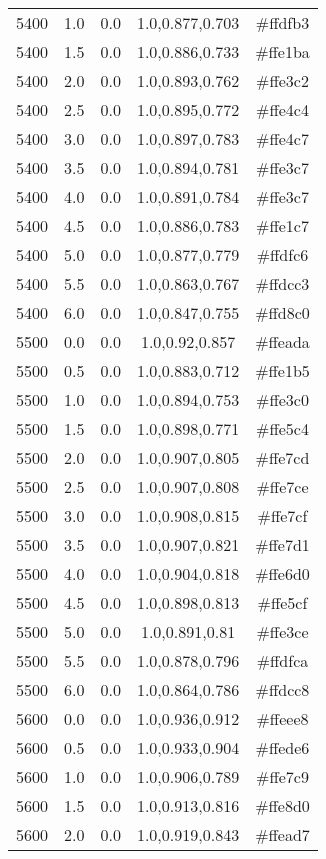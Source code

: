 \begin{tabular}{ccccc}
5400 & 1.0 & 0.0 & 1.0,0.877,0.703 & \#ffdfb3 \\ 
5400 & 1.5 & 0.0 & 1.0,0.886,0.733 & \#ffe1ba \\ 
5400 & 2.0 & 0.0 & 1.0,0.893,0.762 & \#ffe3c2 \\ 
5400 & 2.5 & 0.0 & 1.0,0.895,0.772 & \#ffe4c4 \\ 
5400 & 3.0 & 0.0 & 1.0,0.897,0.783 & \#ffe4c7 \\ 
5400 & 3.5 & 0.0 & 1.0,0.894,0.781 & \#ffe3c7 \\ 
5400 & 4.0 & 0.0 & 1.0,0.891,0.784 & \#ffe3c7 \\ 
5400 & 4.5 & 0.0 & 1.0,0.886,0.783 & \#ffe1c7 \\ 
5400 & 5.0 & 0.0 & 1.0,0.877,0.779 & \#ffdfc6 \\ 
5400 & 5.5 & 0.0 & 1.0,0.863,0.767 & \#ffdcc3 \\ 
5400 & 6.0 & 0.0 & 1.0,0.847,0.755 & \#ffd8c0 \\ 
5500 & 0.0 & 0.0 & 1.0,0.92,0.857 & \#ffeada \\ 
5500 & 0.5 & 0.0 & 1.0,0.883,0.712 & \#ffe1b5 \\ 
5500 & 1.0 & 0.0 & 1.0,0.894,0.753 & \#ffe3c0 \\ 
5500 & 1.5 & 0.0 & 1.0,0.898,0.771 & \#ffe5c4 \\ 
5500 & 2.0 & 0.0 & 1.0,0.907,0.805 & \#ffe7cd \\ 
5500 & 2.5 & 0.0 & 1.0,0.907,0.808 & \#ffe7ce \\ 
5500 & 3.0 & 0.0 & 1.0,0.908,0.815 & \#ffe7cf \\ 
5500 & 3.5 & 0.0 & 1.0,0.907,0.821 & \#ffe7d1 \\ 
5500 & 4.0 & 0.0 & 1.0,0.904,0.818 & \#ffe6d0 \\ 
5500 & 4.5 & 0.0 & 1.0,0.898,0.813 & \#ffe5cf \\ 
5500 & 5.0 & 0.0 & 1.0,0.891,0.81 & \#ffe3ce \\ 
5500 & 5.5 & 0.0 & 1.0,0.878,0.796 & \#ffdfca \\ 
5500 & 6.0 & 0.0 & 1.0,0.864,0.786 & \#ffdcc8 \\ 
5600 & 0.0 & 0.0 & 1.0,0.936,0.912 & \#ffeee8 \\ 
5600 & 0.5 & 0.0 & 1.0,0.933,0.904 & \#ffede6 \\ 
5600 & 1.0 & 0.0 & 1.0,0.906,0.789 & \#ffe7c9 \\ 
5600 & 1.5 & 0.0 & 1.0,0.913,0.816 & \#ffe8d0 \\ 
5600 & 2.0 & 0.0 & 1.0,0.919,0.843 & \#ffead7 \\ 

\end{tabular}
